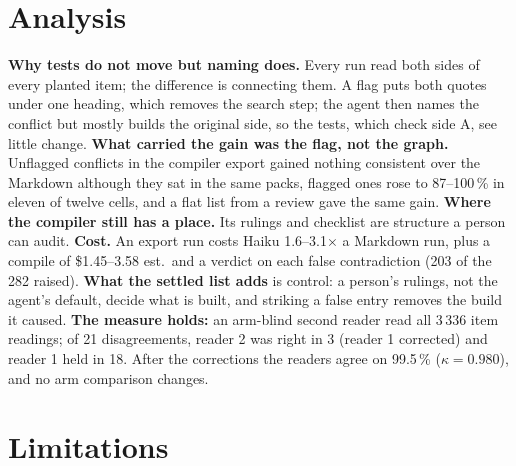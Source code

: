 \documentclass{article}
\begin{document}
\section{Analysis}

\textbf{Why tests do not move but naming does.} Every run read both sides of every planted item; the
difference is connecting them. A flag puts both quotes under one heading, which removes the search step;
the agent then names the conflict but mostly builds the original side, so the tests, which check side A,
see little change. \textbf{What carried the gain was the flag, not the graph.} Unflagged conflicts in the
compiler export gained nothing consistent over the Markdown although they sat in the same packs, flagged
ones rose to 87--100\,\% in eleven of twelve cells, and a flat list from a review gave the same gain.
\textbf{Where the compiler still has a place.} Its rulings and checklist are structure a person can
audit. \textbf{Cost.} An export run costs
Haiku 1.6--3.1$\times$ a Markdown run, plus a compile of \$1.45--3.58 est.\ and a verdict on each false
contradiction (203 of the 282 raised). \textbf{What the settled list adds}
is control: a person's rulings, not the agent's default, decide what is built, and striking a false entry
removes the build it caused. \textbf{The measure holds:} an arm-blind second reader read all 3\,336 item
readings; of 21 disagreements, reader 2 was right in 3 (reader 1 corrected) and reader 1 held in 18. After
the corrections the readers agree on 99.5\,\% ($\kappa = 0.980$), and no arm comparison changes.

\section{Limitations}\label{sec:limits}
\end{document}

